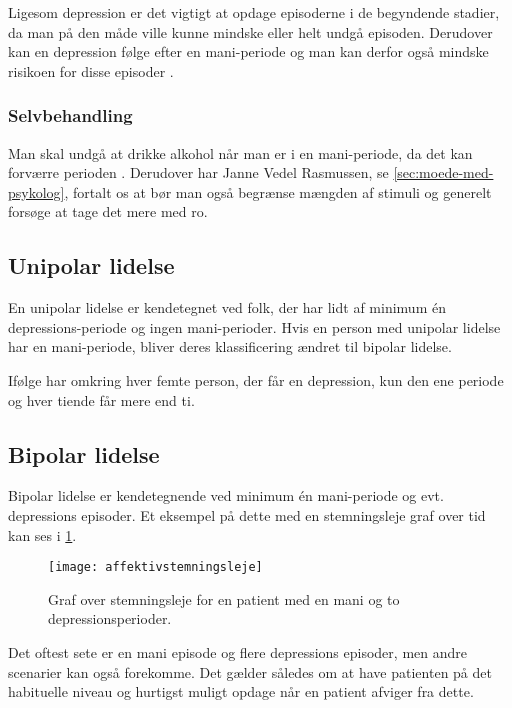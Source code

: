 Ligesom depression er det vigtigt at opdage episoderne i de begyndende stadier, da man på den måde ville kunne mindske eller helt undgå episoden.
Derudover kan en depression følge efter en mani-periode og man kan derfor også mindske risikoen for disse episoder \citep{misc:bipolarsundhed}.

\subsubsection{Selvbehandling}
Man skal undgå at drikke alkohol når man er i en mani-periode, da det kan forværre perioden \citep{misc:netpsykmani}.
Derudover har Janne Vedel Rasmussen, se \cref{sec:moede-med-psykolog}, fortalt os at bør man også begrænse mængden af stimuli og generelt forsøge at tage det mere med ro.

\subsection{Unipolar lidelse}
En unipolar lidelse er kendetegnet ved folk, der har lidt af minimum én depressions-periode og ingen mani-perioder.
Hvis en person med unipolar lidelse har en mani-periode, bliver deres klassificering ændret til bipolar lidelse.

Ifølge \citet{misc:netpsykdepression} har omkring hver femte person, der får en depression, kun den ene periode og hver tiende får mere end ti.

\subsection{Bipolar lidelse}
Bipolar lidelse er kendetegnende ved minimum én mani-periode og evt. depressions episoder.
Et eksempel på dette med en stemningsleje graf over tid kan ses i \cref{fig:stemningslejegrafeksempel}.

\begin{figure}
	\centering
	\texttt{[image: affektivstemningsleje]}
	\caption{Graf over stemningsleje for en patient med en mani og to depressionsperioder.}\label{fig:stemningslejegrafeksempel}
\end{figure}

Det oftest sete er en mani episode og flere depressions episoder, men andre scenarier kan også forekomme.
Det gælder således om at have patienten på det habituelle niveau og hurtigst muligt opdage når en patient afviger fra dette.